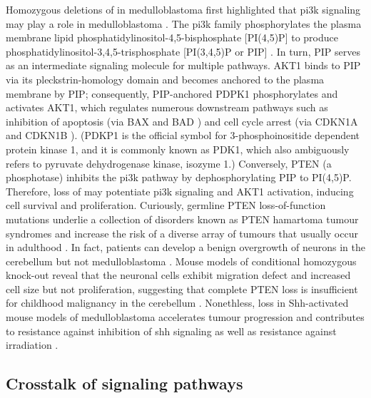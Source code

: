 Homozygous deletions of  in medulloblastoma first highlighted that \gls{pi3k} signaling may play a role in medulloblastoma . The \gls{pi3k} family phosphorylates the plasma membrane lipid phosphatidylinositol-4,5-bisphosphate [PI(4,5)P] to produce phosphatidylinositol-3,4,5-trisphosphate [PI(3,4,5)P or PIP] . In turn, PIP serves as an intermediate signaling molecule for multiple pathways. AKT1 binds to PIP via its pleckstrin-homology domain and becomes anchored to the plasma membrane by PIP; consequently, PIP-anchored PDPK1 phosphorylates and activates AKT1, which regulates numerous downstream pathways such as inhibition of apoptosis (via BAX  and BAD ) and cell cycle arrest (via CDKN1A  and CDKN1B ). (PDKP1 is the official symbol for 3-phosphoinositide dependent protein kinase 1, and it is commonly known as PDK1, which also ambiguously refers to pyruvate dehydrogenase kinase, isozyme 1.) Conversely, PTEN (a phosphotase) inhibits the \gls{pi3k} pathway by dephosphorylating PIP to PI(4,5)P. Therefore, loss of  may potentiate \gls{pi3k} signaling and AKT1 activation, inducing cell survival and proliferation. Curiously, germline PTEN loss-of-function mutations underlie a collection of disorders known as PTEN hamartoma tumour syndromes and increase the risk of a diverse array of tumours that usually occur in adulthood . In fact, patients can develop a benign overgrowth of neurons in the cerebellum but not medulloblastoma . Mouse models of conditional homozygous  knock-out reveal that the neuronal cells exhibit migration defect and increased cell size but not proliferation, suggesting that complete PTEN loss is insufficient for childhood malignancy in the cerebellum . Nonethless,  loss in Shh-activated mouse models of medulloblastoma accelerates tumour progression and contributes to resistance against inhibition of \gls{shh} signaling  as well as resistance against irradiation .


\subsection{Crosstalk of signaling pathways}

